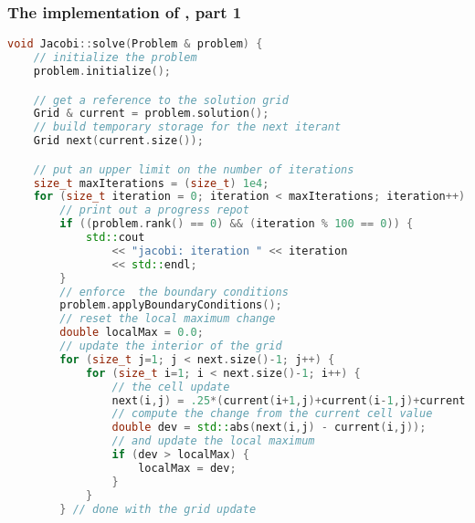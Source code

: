%
%


\begin{frame}[fragile]
%
  \frametitle{The implementation of , part 1}
%
  \begin{lstlisting}[language=c++,name=mpi:solver,fistnumber=14,basicstyle=\tt\bfseries\tiny]
void Jacobi::solve(Problem & problem) {
    // initialize the problem
    problem.initialize();

    // get a reference to the solution grid
    Grid & current = problem.solution();
    // build temporary storage for the next iterant
    Grid next(current.size());

    // put an upper limit on the number of iterations
    size_t maxIterations = (size_t) 1e4;
    for (size_t iteration = 0; iteration < maxIterations; iteration++) {
        // print out a progress repot
        if ((problem.rank() == 0) && (iteration % 100 == 0)) {
            std::cout 
                << "jacobi: iteration " << iteration
                << std::endl;
        }
        // enforce  the boundary conditions
        problem.applyBoundaryConditions();
        // reset the local maximum change
        double localMax = 0.0;
        // update the interior of the grid
        for (size_t j=1; j < next.size()-1; j++) {
            for (size_t i=1; i < next.size()-1; i++) {
                // the cell update
                next(i,j) = .25*(current(i+1,j)+current(i-1,j)+current(i,j+1)+current(i,j-1));
                // compute the change from the current cell value
                double dev = std::abs(next(i,j) - current(i,j));
                // and update the local maximum
                if (dev > localMax) {
                    localMax = dev;
                }
            }
        } // done with the grid update
  \end{lstlisting}
% 
\end{frame}


